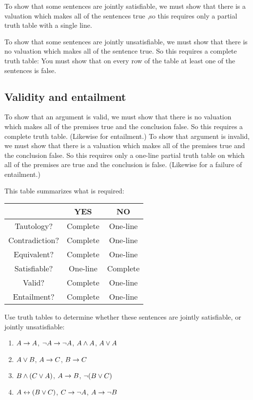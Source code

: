 To show that some sentences are jointly satisfiable, we must show that there is a valuation which makes all of the sentences true ,so this requires only a partial truth table with a single line.

To show that some sentences are jointly unsatisfiable, we must show that there is no valuation which makes all of the sentence true. So this requires a complete truth table: You must show that on every row of the table at least one of the sentences is false.

\subsection{Validity and entailment}

To show that an argument is valid, we must show that there is no valuation which makes all of the premises true and the conclusion false. So this requires a complete truth table. (Likewise for entailment.) To show that argument is invalid, we must show that there is a valuation which makes all of the premises true and the conclusion false. So this requires only a one-line partial truth table on which all of the premises are true and the conclusion is false. (Likewise for a failure of entailment.)

This table summarizes what is required:
\begin{center}
\begin{tabular}{c|c|c}
&YES&NO\\
\hline
Tautology?&Complete&One-line\\
Contradiction?&Complete&One-line\\
Equivalent?&Complete&One-line\\
Satisfiable?&One-line&Complete\\
Valid?&Complete&One-line\\
Entailment?&Complete&One-line\\
\end{tabular}
\end{center}

\practiceproblems
\problempart
\label{pr.TT.satisfiable}
Use truth tables to determine whether these sentences are jointly satisfiable, or jointly unsatisfiable:
\begin{enumerate}
\item $A\rightarrow A$, $\neg A \rightarrow \neg A$, $A\wedge A$, $A\vee A$ %
\item $A\vee B$, $A\rightarrow C$, $B\rightarrow C$ %
\item $B\wedge(C\vee A)$, $A\rightarrow B$, $\neg(B\vee C)$  %
\item $A\leftrightarrow(B\vee C)$, $C\rightarrow \neg A$, $A\rightarrow \neg B$ %
\end{enumerate}


